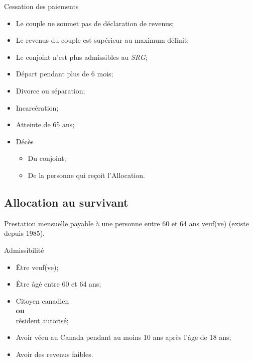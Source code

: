 \documentclass[10pt, french]{article}
\begin{document}
\begin{multicols*}{3}
\begin{conceptgen}{Cessation des paiements}
	\begin{itemize}[leftmargin = *]
		\item	Le couple ne soumet pas de déclaration de revenus;
		\item 	Le revenus du couple est supérieur au maximum définit;
		\item 	Le conjoint n'est plus admissibles au \textit{SRG};
		\item 	Départ pendant plus de 6 mois;
		\item 	Divorce ou séparation;
		\item 	Incarcération;
		\item	Atteinte de 65 ans;
		\item	Décès
			\begin{itemize}[leftmargin = *]
			\item	Du conjoint;
			\item 	De la personne qui reçoit l'Allocation.
			\end{itemize}
	\end{itemize}
\end{conceptgen}

\columnbreak

\subsection{Allocation au survivant}
\label{sec:Alloc_survival}


\begin{definitionNOHFILL}[Définition]
Prestation mensuelle payable à une personne entre 60 et 64 ans veuf(ve) (existe depuis 1985).
\end{definitionNOHFILL}

\begin{conceptgen}{Admissibilité} 
\begin{itemize}[leftmargin = *]
	\item	Être veuf(ve);
	\item	Être âgé entre 60 et 64 ans;
	\item	Citoyen canadien \\
			\textbf{ou}\\
			résident autorisé;			
	\item	Avoir vécu au Canada pendant au moins 10 ans après l'âge de 18 ans;
	\item	Avoir des revenus faibles.
\end{itemize}
\end{conceptgen}


\end{multicols*}
\end{document}
